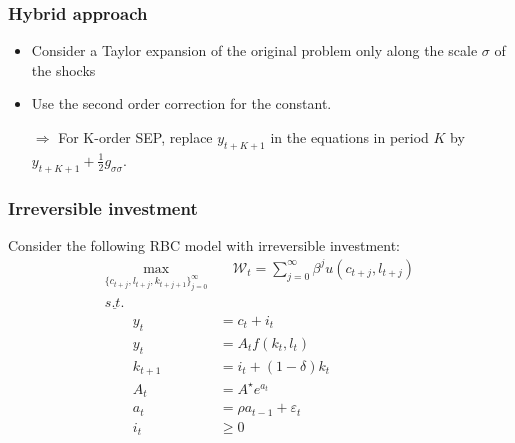\documentclass{beamer}
\begin{document}
\begin{frame}
  \frametitle{Hybrid approach}

\begin{itemize}

  \item Consider a Taylor expansion of the original problem only along the scale $\sigma$ of the shocks\newline

  \item Use the second order correction for the constant.\newline

  \item[$\Rightarrow$] For K-order SEP, replace $y_{t+K+1}$ in the equations in period $K$ by $y_{t+K+1}+\frac{1}{2}g_{\sigma\sigma}$.\newline

\end{itemize}

\bigskip


\end{frame}


\begin{frame}
  \frametitle{Irreversible investment}
Consider the following RBC model with irreversible investment:
\[
  \begin{split}
    \max_{\{c_{t+j},l_{t+j},k_{t+j+1}\}_{j=0}^{\infty}} &\quad \mathcal W_t = \sum_{j=0}^{\infty}\beta^ju(c_{t+j},l_{t+j})\\
           \underline{s.t.}   &  \\
              \qquad y_t &= c_t + i_t\\
              \qquad y_t &= A_tf(k_{t},l_t)\\
              \qquad k_{t+1} &= i_t + (1-\delta)k_{t}\\
              \qquad A_{t} &= {A^{\star}}e^{a_{t}}\\
              \qquad a_{t} &= \rho a_{t-1} + \varepsilon_t\\
              \qquad i_t &\ge 0
  \end{split}
\]
\end{frame}
\end{document}

